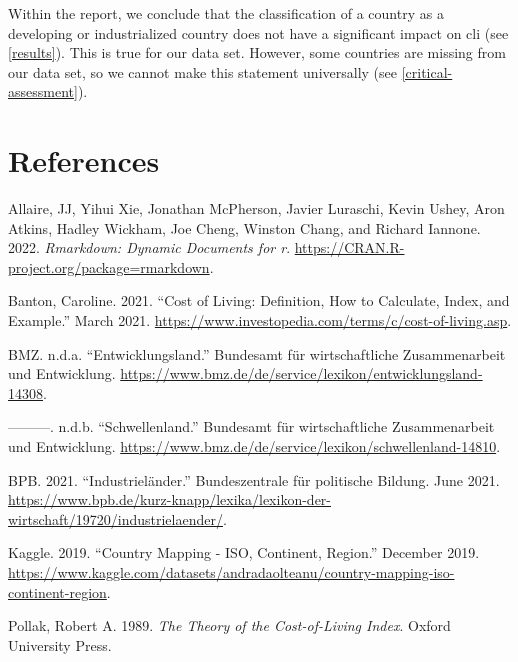 \documentclass[
  11pt,
  a4paper,
  twoside]{scrbook}
\newlength{\cslhangindent}
\newlength{\cslentryspacingunit} %
\newenvironment{CSLReferences}[2] %
 {%
  \setlength{\parindent}{0pt}
  \ifodd #1
  \let\oldpar\par
  \def\par{\hangindent=\cslhangindent\oldpar}
  \fi
    \setlength{\parskip}{#2\cslentryspacingunit+5pt}
   }%
 {}
\begin{document}
Within the report, we conclude that the classification of a country as a developing or industrialized country does not have a significant impact on cli (see \ref{results}). This is true for our data set. However, some countries are missing from our data set, so we cannot make this statement universally (see \ref{critical-assessment}).

\pagebreak

\hypertarget{references}{%
\chapter*{References}\label{references}}

\hypertarget{refs}{}
\begin{CSLReferences}{1}{0}
\leavevmode{}%
Allaire, JJ, Yihui Xie, Jonathan McPherson, Javier Luraschi, Kevin Ushey, Aron Atkins, Hadley Wickham, Joe Cheng, Winston Chang, and Richard Iannone. 2022. \emph{Rmarkdown: Dynamic Documents for r}. \url{https://CRAN.R-project.org/package=rmarkdown}.

\leavevmode{}%
Banton, Caroline. 2021. {``Cost of Living: Definition, How to Calculate, Index, and Example.''} March 2021. \url{https://www.investopedia.com/terms/c/cost-of-living.asp}.

\leavevmode{}%
BMZ. n.d.a. {``Entwicklungsland.''} Bundesamt für wirtschaftliche Zusammenarbeit und Entwicklung. \url{https://www.bmz.de/de/service/lexikon/entwicklungsland-14308}.

\leavevmode{}%
---------. n.d.b. {``Schwellenland.''} Bundesamt für wirtschaftliche Zusammenarbeit und Entwicklung. \url{https://www.bmz.de/de/service/lexikon/schwellenland-14810}.

\leavevmode{}%
BPB. 2021. {``Industrieländer.''} Bundeszentrale für politische Bildung. June 2021. \url{https://www.bpb.de/kurz-knapp/lexika/lexikon-der-wirtschaft/19720/industrielaender/}.

\leavevmode{}%
Kaggle. 2019. {``Country Mapping - ISO, Continent, Region.''} December 2019. \url{https://www.kaggle.com/datasets/andradaolteanu/country-mapping-iso-continent-region}.

\leavevmode{}%
Pollak, Robert A. 1989. \emph{The Theory of the Cost-of-Living Index}. Oxford University Press.


\end{CSLReferences}
\end{document}
